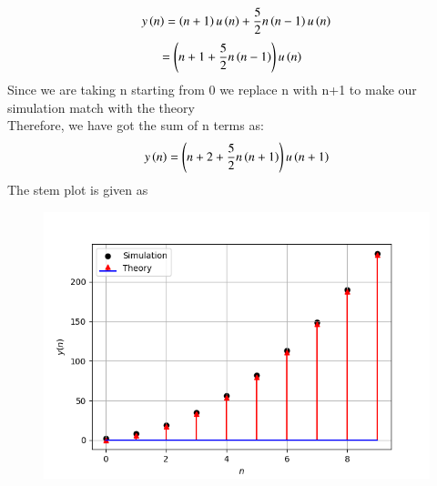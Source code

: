 \documentclass[journal,12pt,twocolumn]{IEEEtran}
\theoremstyle{remark}
\begin{document}
\begin{align}
y\left(n\right) = \left(n+1 \right)u\left(n\right) + \frac{5}{2} n\left(n-1\right) u\left(n\right)
\end{align}
\begin{align}
&= \left(n+1 + \frac{5}{2} n\left(n-1\right)\right)u\left(n\right)
\end{align}
Since we are taking n starting from 0 we replace n with n+1 to make our simulation match with the theory\\Therefore, we have got the sum of n terms as:\\
\begin{align}
y\left(n\right)= \left(n+2 + \frac{5}{2} n\left(n+1\right)\right)u\left(n+1\right)
\end{align}
The stem plot is given as
\begin{figure}[h!]
  \centering
  \includegraphics[width=\columnwidth]{figs/Figure_1.png}
  \label{fig:Stem_Plot}
\end{figure}
\end{document}
